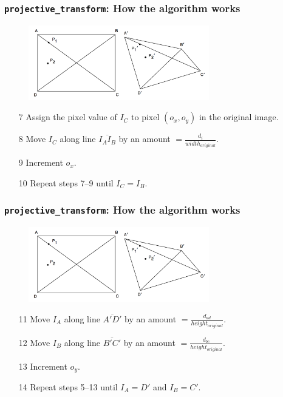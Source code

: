 \documentclass{beamer}
\begin{document}
\begin{frame}
	\frametitle{{\tt projective\_transform}: How the algorithm works}
	\begin{figure}
		\centering
		\includegraphics[width=0.7\textwidth]{../proposal/arbiskew_graphic.png}
	\end{figure}
	\begin{enumerate}
		\item[7] Assign the pixel value of $I_C$ to pixel $(o_x, o_y)$ in the original image.
		\item[8] Move $I_C$ along line $\overline{I_A I_B}$ by an amount $= \frac{d_i}{width_{original}}$.
		\item[9] Increment $o_x$.
		\item[10] Repeat steps 7--9 until $I_C = I_B$.
	\end{enumerate}
\end{frame}

\begin{frame}
	\frametitle{{\tt projective\_transform}: How the algorithm works}
	\begin{figure}
		\centering
		\includegraphics[width=0.7\textwidth]{../proposal/arbiskew_graphic.png}
	\end{figure}
	\begin{enumerate}
	\item[11] Move $I_A$ along line $\overline{A\prime D\prime}$ by an amount $= \frac{d_{ad}}{height_{original}}$.
	\item[12] Move $I_B$ along line $\overline{B\prime C\prime}$ by an amount $= \frac{d_{bc}}{height_{original}}$.
	\item[13] Increment $o_y$.
	\item[14] Repeat steps 5--13 until $I_A = D\prime$ and $I_B = C\prime$.
	\end{enumerate}
\end{frame}
\end{document}
